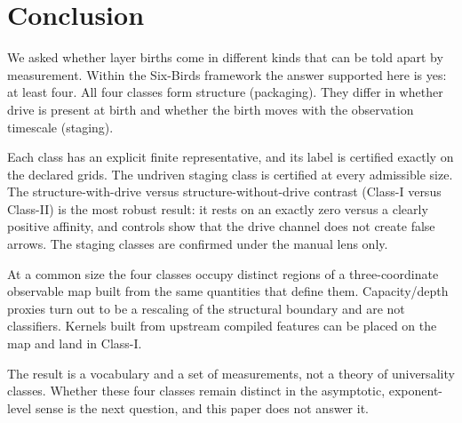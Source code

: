 \section{Conclusion}
\label{sec:conclusion}

We asked whether layer births come in different kinds that can be told apart by measurement. Within the Six-Birds framework the answer supported here is yes: at least four. All four classes form structure (packaging). They differ in whether drive is present at birth and whether the birth moves with the observation timescale (staging).

Each class has an explicit finite representative, and its label is certified exactly on the declared grids. The undriven staging class is certified at every admissible size. The structure-with-drive versus structure-without-drive contrast (Class-I versus Class-II) is the most robust result: it rests on an exactly zero versus a clearly positive affinity, and controls show that the drive channel does not create false arrows. The staging classes are confirmed under the manual lens only.

At a common size the four classes occupy distinct regions of a three-coordinate observable map built from the same quantities that define them. Capacity/depth proxies turn out to be a rescaling of the structural boundary and are not classifiers. Kernels built from upstream compiled features can be placed on the map and land in Class-I.

The result is a vocabulary and a set of measurements, not a theory of universality classes. Whether these four classes remain distinct in the asymptotic, exponent-level sense is the next question, and this paper does not answer it.
